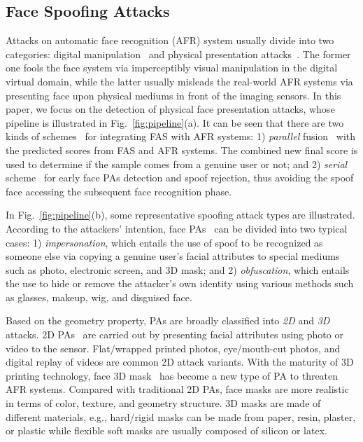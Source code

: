 \documentclass[10pt,journal,compsoc]{IEEEtran}
\begin{document}
\subsection{Face Spoofing Attacks}
Attacks on automatic face recognition (AFR) system usually divide into two categories: digital manipulation~\cite{tolosana2020deepfakes,goswami2019detecting} and physical presentation attacks~\cite{liu2021cross}. The former one fools the face system via imperceptibly visual manipulation in the digital virtual domain, while the latter usually misleads the real-world AFR systems via presenting face upon physical mediums in front of the imaging sensors. In this paper, we focus on the detection of physical face presentation attacks, whose pipeline is illustrated in Fig.~\ref{fig:pipeline}(a). It can be seen that there are two kinds of schemes~\cite{hernandez2019introduction} for integrating FAS with AFR systems: 1) \textit{parallel} fusion~\cite{de2013can} with the predicted scores from FAS and AFR systems. The combined new final score is used to determine if the sample comes from a genuine user or not; and 2) \textit{serial} scheme~\cite{li2018face} for early face PAs detection and spoof rejection, thus avoiding the spoof face accessing the subsequent face recognition phase. 




In Fig.~\ref{fig:pipeline}(b), some representative spoofing attack types are illustrated. According to the attackers' intention, face PAs~\cite{marcel2019handbook} can be divided into two typical cases: 1)  \textit{impersonation}, which entails the use of spoof to be recognized as someone else via copying a genuine user’s facial attributes to special mediums such as photo, electronic screen, and 3D mask; and 2) \textit{obfuscation}, which entails
the use to hide or remove the attacker’s own identity using various methods such as glasses, makeup, wig, and disguised face.

Based on the geometry property, PAs are broadly classified into \textit{2D} and \textit{3D} attacks. 2D PAs~\cite{ramachandra2017presentation} are carried out by presenting facial attributes using photo or video to the sensor. Flat/wrapped printed photos, eye/mouth-cut photos, and digital replay of videos are common 2D attack variants. With the maturity of 3D printing technology, face 3D mask~\cite{jia2020survey} has become a new type of PA to threaten AFR systems. Compared with traditional 2D PAs, face masks are more realistic in terms of color, texture, and
geometry structure. 3D masks are made of different materials, e.g., hard/rigid masks can be made from paper, resin, plaster, or plastic while flexible soft masks are usually composed of silicon or latex. 
\end{document}
